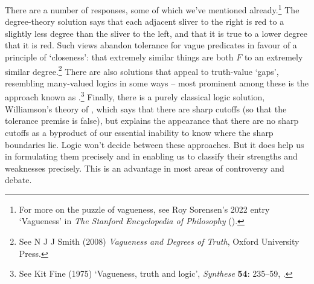 There are a number of responses, some of which we've mentioned already.\footnote{For more on the puzzle of vagueness, see Roy Sorensen's 2022 entry `Vagueness' in \emph{The Stanford Encyclopedia of Philosophy} ().} The degree-theory solution says that each adjacent sliver to the right is red to a slightly less degree than the sliver to the left, and that it is true to a lower degree that it is red. Such views abandon tolerance for vague predicates in favour of a principle of `closeness': that extremely similar things are both $F$ to an extremely similar degree.\footnote{See N J J Smith (2008) \emph{Vagueness and Degrees of Truth}, Oxford University Press.} There are also solutions that appeal to truth-value `gaps', resembling many-valued logics in some ways – most prominent among these is the approach known as .\footnote{See Kit Fine (1975) `Vagueness, truth and logic', \emph{Synthese} \textbf{54}: 235–59, .} Finally, there is a purely classical logic solution, Williamson's theory of , which says that there are sharp cutoffs (so that the tolerance premise is false), but explains the appearance that there are no sharp cutoffs as a byproduct of our essential inability to know where the sharp boundaries lie. Logic won't decide between these approaches. But it does help us in formulating them precisely and in enabling us to classify their strengths and weaknesses precisely. This is an advantage in most areas of controversy and debate.



